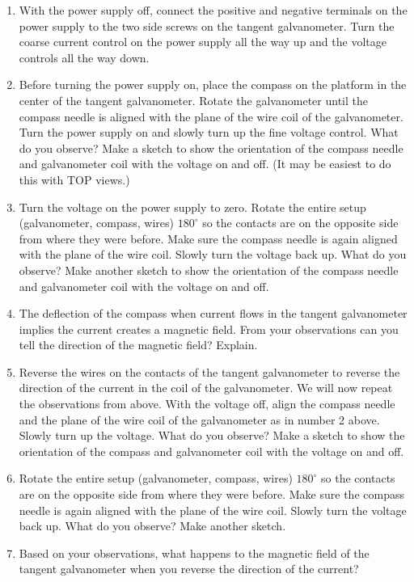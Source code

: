 \begin{enumerate}

\item With the power supply off, connect the positive and negative terminals 
on the power supply to the two side screws on the tangent galvanometer. Turn 
the coarse current control on the power supply all the way up and the voltage 
controls all the way down.

\item Before turning the power supply on, place the compass on the platform 
in the center of the tangent galvanometer. Rotate the galvanometer until the 
compass needle is aligned with the plane of the wire coil of the galvanometer.
Turn the power supply on and slowly turn up the fine voltage control.
What do you observe? Make a sketch to show the orientation of the compass 
needle and galvanometer coil with the voltage on and off. 
(It may be easiest to do this with TOP views.)
\vspace{20mm}

\newpage

\item Turn the voltage on the power supply to zero.
Rotate the entire setup (galvanometer, compass, wires) $180^\circ$
so the contacts are on the opposite side from where they were before.
Make sure the compass needle is again aligned with the plane of the wire coil.
Slowly turn the voltage back up. What do you observe?
Make another sketch to show the orientation of the compass needle and
galvanometer coil with the voltage on and off.
\vspace{30mm}

\item The deflection of the compass when current flows in the tangent 
galvanometer implies the current creates a magnetic field.
From your observations can you tell the direction
of the magnetic field?  Explain.
\vspace{30mm}

\item Reverse the wires on the contacts of the tangent galvanometer to reverse 
the direction of the current in the coil of the galvanometer.
We will now repeat the observations from above.
With the voltage off, align the compass needle and the plane of the wire coil 
of the galvanometer as in number 2 above.
Slowly turn up the voltage.
What do you observe?
Make a sketch to show the orientation of the compass and
galvanometer coil with the voltage on and off.
\vspace{30mm}

\item Rotate the entire setup (galvanometer, compass, wires) $180^\circ$
so the contacts are on the opposite side from where they were before.
Make sure the compass needle is again aligned with the plane of the wire coil.
Slowly turn the voltage back up. What do you observe?
 Make another sketch.
\vspace{30mm}

\item Based on your observations, what happens to the magnetic field of the 
tangent galvanometer when you reverse the direction of the current?

\end{enumerate}

